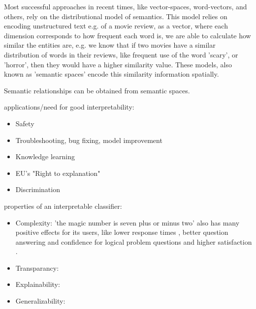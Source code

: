 
Most successful approaches in recent times, like vector-spaces, word-vectors, and others, rely on the distributional model of semantics. This model relies on encoding unstructured text e.g. of a movie review, as a vector, where each dimension corresponds to how frequent each word is, we are able to calculate how similar the entities are, e.g. we know that if two movies have a similar distribution of words in their reviews, like frequent use of the word 'scary', or 'horror', then they would have a higher similarity value. These models, also known as 'semantic spaces' encode this similarity information spatially.

Semantic relationships can be obtained from semantic spaces. 

applications/need for good interpretability:
\begin{itemize}
	\item Safety
	\item Troubleshooting, bug fixing, model improvement
	\item Knowledge learning
	\item EU's "Right to explanation"
	\item Discrimination
\end{itemize}

properties of an interpretable classifier:
\begin{itemize}
	\item Complexity: 'the magic number is seven plus or minus two' \cite{Saaty2003} also has many positive effects for its users, like lower response times \cite{Narayanan2018, Huysmans2011}, better question answering and confidence for logical problem questions \cite{Huysmans2011} and higher satisfaction \cite{Narayanan2018}.
	\item Transparancy: 
	\item Explainability: 
	\item Generalizability:
\end{itemize}


